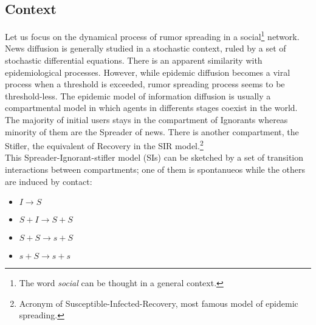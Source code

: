 \subsection{Context}
Let us focus on the dynamical process of rumor spreading in a social\footnote{The word \textit{social} can be thought in a general context.} network.
\\ News diffusion is generally studied in a stochastic context, ruled by a set of stochastic differential equations.
 There is an apparent similarity with epidemiological processes. 
However, while epidemic diffusion becomes a viral process when a threshold is exceeded, rumor spreading process seems to be threshold-less.
 The epidemic model of information diffusion is usually a compartmental model in which agents in differents stages coexist in the world.
The majority of initial users stays in the compartment of Ignorants whereas minority of them are the Spreader of news.
 There is another compartment, the Stifler, the equivalent of Recovery in the SIR model.\footnote{Acronym of Susceptible-Infected-Recovery, most famous model of epidemic spreading.}
\\ This Spreader-Ignorant-stifler model (SIs) can be sketched by a set of transition interactions between compartments; one of them is spontanueos while the others are induced by contact:
\begin{itemize}
\item$ I \longrightarrow S$
\item $S+I \longrightarrow S + S$

\item $S + S \longrightarrow s + S$

\item $s + S \longrightarrow  s + s$
\end{itemize}

